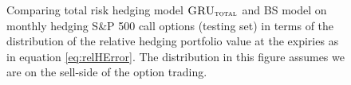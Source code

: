 \documentclass[letterpaper,12pt,titlepage,oneside,final]{book}
\numberwithin{equation}{section}
\theoremstyle{definition}
\newcommand{\modelT}{\textsc{GRU}_{\textsc{total}}}
\begin{document}
\begin{figure}[htp!]
		\centering
	\caption{Comparing total risk hedging model $\modelT$ and BS model  on monthly hedging S\&P 500 call options (testing set) in terms of the distribution of the  relative hedging portfolio value at the expiries as in equation \eqref{eq:relHError}. The distribution in this figure assumes we are on the sell-side of the option trading.} 
	\label{fig:CallTotalM2}
		\centering

\end{figure}
\end{document}
